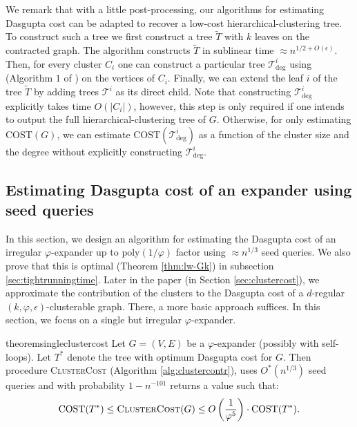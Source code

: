 \documentclass[letterpaper,11pt]{article}
\newcommand{\CT}{\text{COST}}
\theoremstyle{plain}
\theoremstyle{definition}
\theoremstyle{remark}
\newcommand{\poly}{\text{poly}}
\begin{document}
We remark that with a little post-processing, our algorithms for estimating Dasgupta cost can be adapted to recover a low-cost hierarchical-clustering tree. To construct such a tree we first construct a tree $\widetilde{T}$ with $k$ leaves on the contracted graph. The algorithm constructs $\widetilde{T}$ in sublinear time $\approx n^{1/2+O(\epsilon)}$.
Then, for every cluster $C_i$ one can construct a particular tree $\mathcal{T}^i_{\deg}$ using (Algorithm $1$ of \cite{MSun21}) on the vertices of $C_i$. Finally, we can extend the leaf $i$ of the tree $\widetilde{T}$ by adding trees $\mathcal{T}^i$ as its direct child. Note that constructing $\mathcal{T}^i_{\deg}$ explicitly takes time $O(|C_i|)$, however, this step is only required if one intends to output the full hierarchical-clustering tree of $G$. Otherwise, for only estimating $\CT(G)$, we can estimate $\CT(\mathcal{T}^i_{\deg})$ as a function of the cluster size and the degree without explicitly constructing $\mathcal{T}^i_{\deg}$. 






 \vspace{-5pt}

\subsection{Estimating Dasgupta cost of an expander using seed queries}\label{sec:expandercost-overview}
In this section, we design an algorithm for estimating the Dasgupta cost of an irregular $\varphi$-expander up to $\poly(1/\varphi)$ factor using $\approx n^{1/3}$ seed queries. We also prove that this is optimal (Theorem \ref{thm:lw-Gk}) in subsection \ref{sec:tightrunningtime}. Later in the paper (in Section \ref{sec:clustercost}), we approximate the contribution of the clusters to the Dasgupta cost of a $d$-regular $(k,\varphi, \epsilon)$-clusterable graph. There, a more basic approach suffices. In this section, we focus on a single but irregular $\varphi$-expander. 


\begin{restatable}{theorem}{singleclustercost}
	\label{thm:singleclustercost}
	Let $G=(V,E)$ be a $\varphi$-expander (possibly with self-loops).  Let $T^*$ denote the tree
	with optimum Dasgupta cost for $G$. 
	Then procedure \textsc{ClusterCost} (Algorithm \ref{alg:clustercontr}), uses $O^*\left(n^{1/3}\right)$ seed queries and with probability $1-n^{-101}$ returns a value such that:
	\[ \CT(T^*) \leq \textsc{ClusterCost}(G) \leq O\left(\frac{1}{\varphi^{5}}\right)\cdot  \CT(T^*) \text{.} \]
\end{restatable} 
\end{document}
